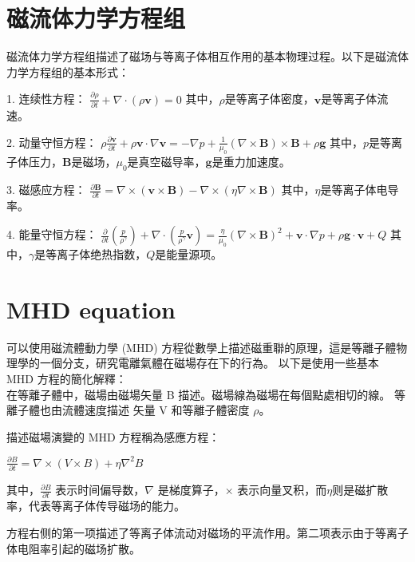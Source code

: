 \documentclass[12pt, a4paper, oneside]{article}
\begin{document}
\begin{spacing}{2.0}
\section{磁流体力学方程组}

磁流体力学方程组描述了磁场与等离子体相互作用的基本物理过程。以下是磁流体力学方程组的基本形式：

1. 连续性方程：
$\displaystyle \frac{\partial \rho}{\partial t} + \nabla \cdot (\rho \mathbf{v}) = 0$
其中，$\rho$是等离子体密度，$\mathbf{v}$是等离子体流速。

2. 动量守恒方程：
$\displaystyle \rho \frac{\partial \mathbf{v}}{\partial t} + \rho \mathbf{v} \cdot \nabla \mathbf{v} = -\nabla p + \frac{1}{\mu_0}(\nabla \times \mathbf{B}) \times \mathbf{B} + \rho \mathbf{g}$
其中，$p$是等离子体压力，$\mathbf{B}$是磁场，$\mu_0$是真空磁导率，$\mathbf{g}$是重力加速度。

3. 磁感应方程：
$\displaystyle \frac{\partial \mathbf{B}}{\partial t} = \nabla \times (\mathbf{v} \times \mathbf{B}) - \nabla \times (\eta \nabla \times \mathbf{B})$
其中，$\eta$是等离子体电导率。

4. 能量守恒方程：
$\displaystyle \frac{\partial}{\partial t} (\frac{p}{\rho^\gamma}) + \nabla \cdot (\frac{p}{\rho^\gamma} \mathbf{v}) = \frac{\eta}{\mu_0} (\nabla \times \mathbf{B})^2 + \mathbf{v} \cdot \nabla p + \rho \mathbf{g} \cdot \mathbf{v} + Q$
其中，$\gamma$是等离子体绝热指数，$Q$是能量源项。

\section{MHD equation}

可以使用磁流體動力學 (MHD) 方程從數學上描述磁重聯的原理，這是等離子體物理學的一個分支，研究電離氣體在磁場存在下的行為。
以下是使用一些基本 MHD 方程的簡化解釋：\\
在等離子體中，磁場由磁場矢量 B 描述。磁場線為磁場在每個點處相切的線。 等離子體也由流體速度描述
矢量 V 和等離子體密度 $\rho$。

描述磁場演變的 MHD 方程稱為感應方程：\begin{center}
    $\displaystyle\frac{\partial B}{\partial t} = \nabla\times (V\times B) + \eta \nabla^2 B$
\end{center}

其中，$\displaystyle\frac{\partial B}{\partial t}$ 表示时间偏导数，$\nabla$ 是梯度算子，$\times$ 表示向量叉积，而$\eta$则是磁扩散率，代表等离子体传导磁场的能力。

方程右侧的第一项描述了等离子体流动对磁场的平流作用。第二项表示由于等离子体电阻率引起的磁场扩散。


\end{spacing}
\end{document}
